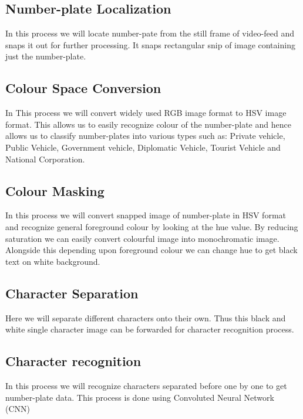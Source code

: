 \subsection{Number-plate Localization}
In this process we will locate number-pate from the still frame of video-feed and snaps it out for further processing. It snaps rectangular snip of image containing just the number-plate.
\subsection{Colour Space Conversion}
In This process we will convert widely used RGB image format to HSV image format. This allows us to easily recognize colour of the number-plate and hence allows us to classify number-plates into various types such as: Private vehicle, Public Vehicle, Government vehicle, Diplomatic Vehicle, Tourist Vehicle and National Corporation. 
\subsection{Colour Masking}
In this process we will convert snapped image of number-plate in HSV format and recognize general foreground colour by looking at the hue value. By reducing saturation we can easily convert colourful image into monochromatic image. Alongside this depending upon foreground colour we can change hue to get black text on white background.  
\subsection{Character Separation}
Here we will separate different characters onto their own. Thus this black and white single character image can be forwarded for character recognition process.
\subsection{Character recognition}
In this process we will recognize characters separated before one by one to get number-plate data. This process is done using Convoluted Neural Network (CNN) 